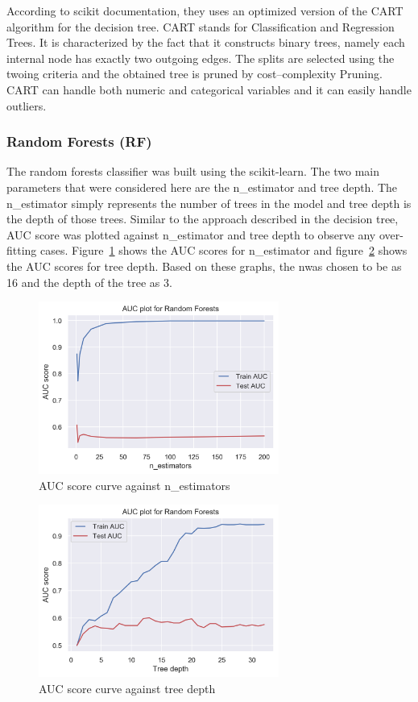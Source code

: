 According to scikit documentation, they uses an optimized version of the CART algorithm for the decision tree. CART stands for Classification and Regression Trees. It is characterized by the fact that it constructs binary trees, namely each internal node has exactly two outgoing edges. The splits are selected using the twoing criteria and the obtained tree is pruned by cost–complexity Pruning. CART can handle both numeric and categorical variables and it can easily handle outliers\cite{ref_url3}.
\\

\subsubsection{Random Forests (RF)}
The random forests classifier was built using the scikit-learn. The two main parameters that were considered here are the n\_estimator and tree depth. The n\_estimator simply represents the number of trees in the model and tree depth is the depth of those trees. Similar to the approach described in the decision tree, AUC score was plotted against n\_estimator and tree depth to observe any over-fitting cases. Figure~\ref{fig:fig2} shows the AUC scores for n\_estimator and figure~\ref{fig:fig3} shows the AUC scores for tree depth. Based on these graphs, the n\estimator was chosen to be as 16 and the depth of the tree as 3.
\begin{figure}[!ht]
 \centering
\includegraphics[width=3.1in]{assignment2/1-3-RandomForests_AUC(n_estimators).png}
\caption{\label{fig:fig2}AUC score curve against n\_estimators}
\end{figure}

\begin{figure}[!ht]
 \centering
\includegraphics[width=3.1in]{assignment2/1-3-RandomForests_AUC(TreeDepth).png}
\caption{\label{fig:fig3}AUC score curve against tree depth}
\end{figure}

